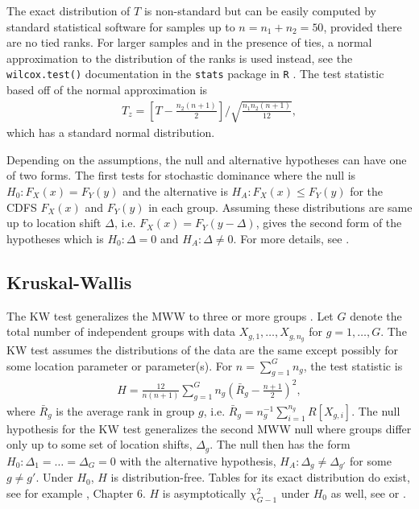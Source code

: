 \documentclass[12pt]{article}
\theoremstyle{plain}
\begin{document}
	The exact distribution of $T$ is non-standard but can be easily computed by standard statistical software for samples up to $n = n_1 + n_2 = 50$, provided there are no tied ranks. For larger samples and in the presence of ties, a normal approximation to the distribution of the ranks is used instead, see the \texttt{wilcox.test()} documentation in the \texttt{stats} package in \texttt{R} \citep{Stats2022}. The test statistic based off of the normal approximation is
	\begin{align*}
		T_z = \left[T - \frac{n_2(n+1)}{2}\right]\bigg/ \sqrt{\frac{n_1 n_2 (n+1)}{12}},
	\end{align*}
	which has a standard normal distribution.
	
	Depending on the assumptions, the null and alternative hypotheses can have one of two forms. The first tests for stochastic dominance where the null is $H_0: F_X(x) = F_Y(y)$ and the alternative is $H_A: F_X(x) \leq F_Y(y)$ for the CDFS $F_X(x)$ and $F_Y(y)$ in each group. Assuming these distributions are same up to location shift $\Delta$, i.e. $F_X(x) = F_Y(y-\Delta)$, gives the second form of the hypotheses which is $H_0: \Delta = 0$ and $H_A: \Delta \neq 0$. For more details, see \cite{Kloke2015}.

	\subsection{Kruskal-Wallis}
	
	The KW test generalizes the MWW to three or more groups \citep{KruskalWallis1952,Kloke2015}. Let $G$ denote the total number of independent groups with data $X_{g,1}, \ldots, X_{g,n_g}$ for $g = 1, \ldots, G$. The KW test assumes the distributions of the data are the same except possibly for some location parameter or parameter(s). For $n = \sum_{g=1}^G n_g$, the test statistic is
	\begin{align*}
		H = \frac{12}{n(n+1)} \sum_{g = 1}^G n_{g} \left( \bar{R}_g - \frac{n+1}{2} \right)^2,
	\end{align*}
	where $\bar{R}_g$ is the average rank in group $g$, i.e. $\bar{R}_g = n_g^{-1} \sum_{i=1}^{n_g} R[X_{g,i}]$. The null hypothesis for the KW test generalizes the second MWW null where groups differ only up to some set of location shifts, $\Delta_g$. The null then has the form $H_0 : \Delta_1 = \ldots = \Delta_G = 0$ with the alternative hypothesis, $H_A : \Delta_g \neq \Delta_{g'}$ for some $g \neq g'$. Under $H_0$, $H$ is distribution-free. Tables for its exact distribution do exist, see for example \cite{Hollander1999}, Chapter 6. $H$ is asymptotically $\chi_{G-1}^2$ under $H_0$ as well, see \cite{KruskalWallis1952} or \cite{Kloke2015}.
	
\end{document}

